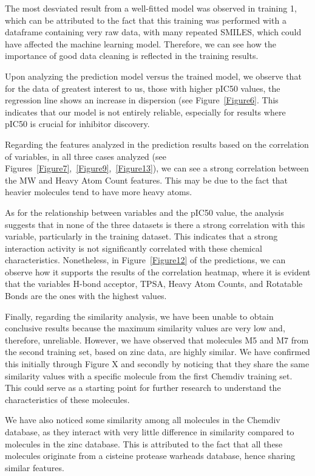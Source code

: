 \documentclass[final,times,twocolumn,article]{elsarticle}
\begin{document}
The most desviated result from a well-fitted model was observed in training 1, which can be attributed to the fact that this training was performed with a dataframe containing very raw data, with many repeated SMILES, which could have affected the machine learning model. Therefore, we can see how the importance of good data cleaning is reflected in the training results.

Upon analyzing the prediction model versus the trained model, we observe that for the data of greatest interest to us, those with higher pIC50 values, the regression line shows an increase in dispersion (see Figure~\ref{Figure6}. This indicates that our model is not entirely reliable, especially for results where pIC50 is crucial for inhibitor discovery.

Regarding the features analyzed in the prediction results based on the correlation of variables, in all three cases analyzed (see Figures~\ref{Figure7},~\ref{Figure9},~\ref{Figure13}), we can see a strong correlation between the MW and Heavy Atom Count features. This may be due to the fact that heavier molecules tend to have more heavy atoms.

As for the relationship between variables and the pIC50 value, the analysis suggests that in none of the three datasets is there a strong correlation with this variable, particularly in the training dataset. This indicates that a strong interaction activity is not significantly correlated with these chemical characteristics. Nonetheless, in Figure~\ref{Figure12} of the predictions, we can observe how it supports the results of the correlation heatmap, where it is evident that the variables H-bond acceptor, TPSA, Heavy Atom Counts, and Rotatable Bonds are the ones with the highest values.

Finally, regarding the similarity analysis, we have been unable to obtain conclusive results because the maximum similarity values are very low and, therefore, unreliable. However, we have observed that molecules M5 and M7 from the second training set, based on zinc data, are highly similar. We have confirmed this initially through Figure X and secondly by noticing that they share the same similarity values with a specific molecule from the first Chemdiv training set. This could serve as a starting point for further research to understand the characteristics of these molecules.

We have also noticed some similarity among all molecules in the Chemdiv database, as they interact with very little difference in similarity compared to molecules in the zinc database. This is attributed to the fact that all these molecules originate from a cisteine protease warheads database, hence sharing similar features.
\end{document}
